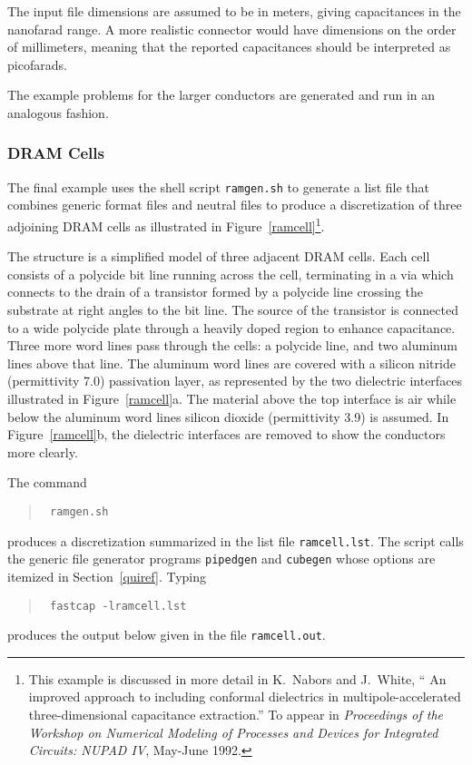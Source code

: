 The input file dimensions are assumed to be in meters, giving
capacitances in the nanofarad range. A more realistic connector
would have dimensions on the order of millimeters, meaning that
the reported capacitances should be interpreted as picofarads.


The example problems
for the larger conductors are generated and run in an analogous
fashion.

\subsubsection{DRAM Cells}
\label{dram}

The final example uses the shell script {\tt ramgen.sh} to generate
a list file that combines generic format files and neutral files
to produce a discretization of three adjoining DRAM cells as
illustrated in Figure~\ref{ramcell}\footnote{
This example is discussed in more detail in
K.\ Nabors and J.\ White,
`` An improved approach to including conformal dielectrics in
        multipole-accelerated three-dimensional capacitance extraction.''
To appear in {\em Proceedings of the Workshop on Numerical Modeling
of Processes and Devices for Integrated Circuits: NUPAD IV}, May-June
1992.
}. 
%
%

The 
structure is a simplified model
of three adjacent DRAM cells.
Each cell consists of a polycide
bit line running across the cell, terminating
in a via which connects to the drain of a transistor formed by
a polycide line crossing the substrate at right angles to the
bit line. The source of the transistor
is connected to a  wide polycide plate through a heavily doped
region to enhance capacitance. Three more word lines pass through the
cells: a polycide line, and two
aluminum lines above that line.
The aluminum word lines are covered with
a silicon nitride (permittivity 7.0) passivation layer, as represented
by the two dielectric interfaces illustrated in 
Figure~\ref{ramcell}a.  The material above the top interface is air
while below the aluminum word lines silicon dioxide
(permittivity 3.9) is assumed.
In Figure~\ref{ramcell}b, the dielectric interfaces are removed to show
the conductors more clearly.


The command 
\begin{quote}\tt
ramgen.sh
\end{quote}
produces a discretization 
summarized in the list file {\tt ramcell.lst}. 
The 
script calls the generic file generator programs {\tt pipedgen}
and {\tt cubegen} whose options are itemized in
Section~\ref{quiref}. Typing
\begin{quote}\tt
fastcap -lramcell.lst
\end{quote}
produces the output below given in the file {\tt ramcell.out}. 

